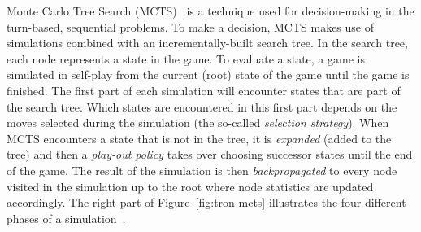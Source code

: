 \documentclass{article}
\begin{document}
Monte Carlo Tree Search (MCTS)~\cite{coulom, kocsis} is a technique used for decision-making in the turn-based, 
sequential problems. 
To make a decision, MCTS makes use of simulations combined with an incrementally-built search tree. 
In the search tree, each node represents a state in the game. To evaluate a state, a game is simulated in self-play from the current (root) state of the game until the game is finished. The first part of each simulation will encounter states that are part of the search tree. Which states are encountered in this first part depends on the moves selected during the simulation (the so-called {\it selection strategy}). When MCTS encounters a state that is not in the tree, it is {\it expanded} (added to the tree) and then a {\it play-out policy} takes over choosing successor states until the end of the game. 
The result of the simulation is then {\it backpropagated} to every node visited in the simulation up to the root where 
node statistics are updated accordingly.
The right part of Figure~\ref{fig:tron-mcts} illustrates the four different phases of a simulation~\cite{ChaslotWHUB2008}.
\end{document}
